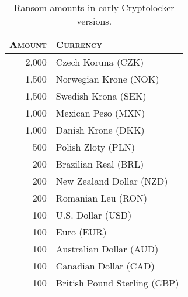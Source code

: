 \begin{table}[!htp]
    \centering
    \begin{tabular}{rl}
        \toprule
        \textsc{Amount} & \textsc{Currency} \\
        \midrule
        2,000 &    Czech Koruna (CZK)\\
        1,500 &    Norwegian Krone (NOK)\\
        1,500 &    Swedish Krona (SEK)\\
        1,000 &    Mexican Peso (MXN)\\
        1,000 &    Danish Krone (DKK)\\
        500 & Polish Zloty (PLN)\\
        200 & Brazilian Real (BRL)\\
        200 & New Zealand Dollar (NZD)\\
        200 & Romanian Leu (RON)\\
        100 & U.S. Dollar (USD)\\
        100 & Euro (EUR)\\
        100 & Australian Dollar (AUD)\\
        100 & Canadian Dollar (CAD)\\
        100 & British Pound Sterling (GBP)\\
        \bottomrule
    \end{tabular}
    \caption{Ransom amounts in early Cryptolocker versions.}
    \label{tab:crypto_ransoms}
\end{table}

